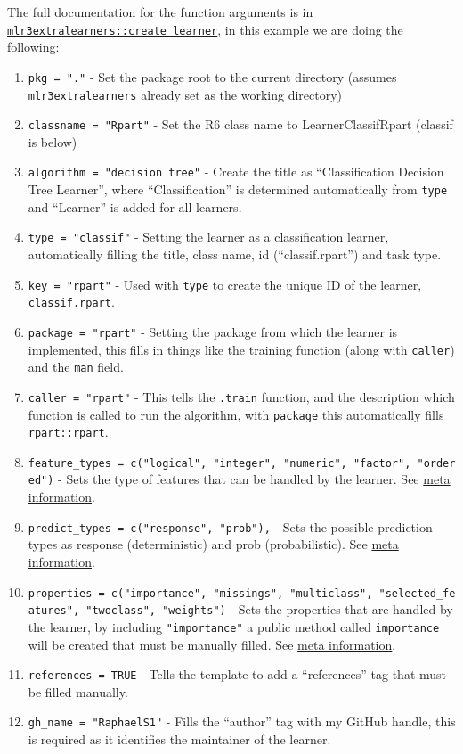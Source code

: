 \documentclass[
]{scrbook}
\providecommand{\tightlist}{%
  \setlength{\itemsep}{0pt}\setlength{\parskip}{0pt}}
\begin{document}
The full documentation for the function arguments is in \href{https://mlr3extralearners.mlr-org.com/reference/create_learner.html}{\texttt{mlr3extralearners::create\_learner}}, in this example we are doing the following:

\begin{enumerate}
\def\labelenumi{\arabic{enumi}.}
\tightlist
\item
  \texttt{pkg\ =\ "."} - Set the package root to the current directory (assumes \texttt{mlr3extralearners} already set as the working directory)
\item
  \texttt{classname\ =\ "Rpart"} - Set the R6 class name to LearnerClassifRpart (classif is below)
\item
  \texttt{algorithm\ =\ "decision\ tree"} - Create the title as ``Classification Decision Tree Learner'', where ``Classification'' is determined automatically from \texttt{type} and ``Learner'' is added for all learners.
\item
  \texttt{type\ =\ "classif"} - Setting the learner as a classification learner, automatically filling the title, class name, id (``classif.rpart'') and task type.
\item
  \texttt{key\ =\ "rpart"} - Used with \texttt{type} to create the unique ID of the learner, \texttt{classif.rpart}.
\item
  \texttt{package\ =\ "rpart"} - Setting the package from which the learner is implemented, this fills in things like the training function (along with \texttt{caller}) and the \texttt{man} field.
\item
  \texttt{caller\ =\ "rpart"} - This tells the \texttt{.train} function, and the description which function is called to run the algorithm, with \texttt{package} this automatically fills \texttt{rpart::rpart}.
\item
  \texttt{feature\_types\ =\ c("logical",\ "integer",\ "numeric",\ "factor",\ "ordered")} - Sets the type of features that can be handled by the learner. See \protect\hyperlink{learner-meta-information}{meta information}.
\item
  \texttt{predict\_types\ =\ c("response",\ "prob"),} - Sets the possible prediction types as response (deterministic) and prob (probabilistic). See \protect\hyperlink{learner-meta-information}{meta information}.
\item
  \texttt{properties\ =\ c("importance",\ "missings",\ "multiclass",\ "selected\_features",\ "twoclass",\ "weights")} - Sets the properties that are handled by the learner, by including \texttt{"importance"} a public method called \texttt{importance} will be created that must be manually filled. See \protect\hyperlink{learner-meta-information}{meta information}.
\item
  \texttt{references\ =\ TRUE} - Tells the template to add a ``references'' tag that must be filled manually.
\item
  \texttt{gh\_name\ =\ "RaphaelS1"} - Fills the ``author'' tag with my GitHub handle, this is required as it identifies the maintainer of the learner.
\end{enumerate}
\end{document}
